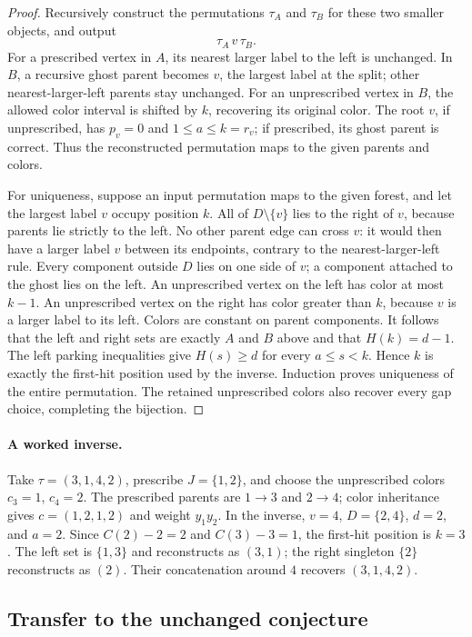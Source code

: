 \documentclass[11pt,a4paper]{article}
\theoremstyle{definition}
\theoremstyle{remark}
\begin{document}
\begin{proof}
Recursively construct the permutations $\tau_A$ and $\tau_B$ for these
two smaller objects, and output
\[
                         \tau_A\,v\,\tau_B.
\]
For a prescribed vertex in $A$, its nearest larger label to the left is
unchanged. In $B$, a recursive ghost parent becomes $v$, the largest
label at the split; other nearest-larger-left parents stay unchanged.
For an unprescribed vertex in $B$, the allowed color interval is shifted
by $k$, recovering its original color. The root $v$, if unprescribed,
has $p_v=0$ and $1\le a\le k=r_v$; if prescribed, its ghost parent is
correct. Thus the reconstructed permutation maps to the given parents
and colors.

For uniqueness, suppose an input permutation maps to the given forest,
and let the largest label $v$ occupy position $k$. All of $D\setminus
\{v\}$ lies to the right of $v$, because parents lie strictly to the left.
No other parent edge can cross $v$: it would then have a larger label
$v$ between its endpoints, contrary to the nearest-larger-left rule.
Every component outside $D$ lies on one side of $v$; a component attached
to the ghost lies on the left. An unprescribed vertex on the left has
color at most $k-1$. An unprescribed vertex on the right has color greater
than $k$, because $v$ is a larger label to its left. Colors are constant
on parent components. It follows that the left and right sets are exactly
$A$ and $B$ above and that $H(k)=d-1$. The left parking inequalities give
$H(s)\ge d$ for every $a\le s<k$. Hence $k$ is exactly the first-hit
position used by the inverse. Induction proves uniqueness of the entire
permutation. The retained unprescribed colors also recover every gap
choice, completing the bijection.
\end{proof}

\paragraph{A worked inverse.}
Take $\tau=(3,1,4,2)$, prescribe $J=\{1,2\}$, and choose the unprescribed
colors $c_3=1$, $c_4=2$. The prescribed parents are $1\to3$ and $2\to4$;
color inheritance gives $c=(1,2,1,2)$ and weight $y_1y_2$. In the inverse,
$v=4$, $D=\{2,4\}$, $d=2$, and $a=2$. Since $C(2)-2=2$ and $C(3)-3=1$,
the first-hit position is $k=3$. The left set is $\{1,3\}$ and reconstructs
as $(3,1)$; the right singleton $\{2\}$ reconstructs as $(2)$. Their
concatenation around $4$ recovers $(3,1,4,2)$.

\subsection{Transfer to the unchanged conjecture}
\end{document}
